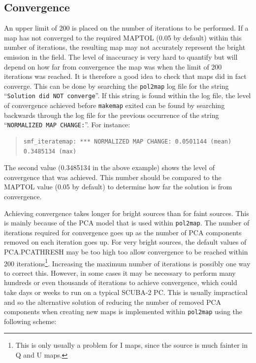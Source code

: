 \documentclass[twoside,11pt]{starlink}
\begin{document}
\subsection{Convergence}
An upper limit of 200 is placed on the number of iterations to be
performed. If a map has not converged to the required MAPTOL (0.05 by
default) within this number of iterations, the resulting map may not
accurately represent the bright emission in the field. The level of
inaccuracy is very hard to quantify but will depend on how far from
convergence the map was when the limit of 200 iterations was reached. It
is therefore a good idea to check that maps did in fact converge. This
can be done by searching the \texttt{pol2map} log file for the string
``\texttt{Solution did NOT converge}''. If this string is found within
the log file, the level of convergence achieved before \texttt{makemap}
exited can be found by searching backwards through the log file for the
previous occurrence of the string ``\texttt{NORMALIZED MAP CHANGE:}''. For
instance:

\begin{quote}
\begin{verbatim}
smf_iteratemap: *** NORMALIZED MAP CHANGE: 0.0501144 (mean) 0.3485134 (max)
\end{verbatim}
\end{quote}

The second value (0.3485134 in the above example) shows the level of
convergence that was achieved. This number should be compared to the
MAPTOL value (0.05 by default) to determine how far the solution is from
convergence.

Achieving convergence takes longer for bright sources than for faint
sources. This is mainly because of the PCA model that is used within
\texttt{pol2map}. The number of iterations required for convergence goes
up as the number of PCA components removed on each iteration goes up. For
very bright sources, the default values of PCA.PCATHRESH may be too high
too allow convergence to be reached within 200 iterations\footnote{This
is only usually a problem for I maps, since the source is much fainter in
Q and U maps.}. Increasing the maximum number of iterations is possibly
one way to correct this. However, in some cases it may be necessary to
perform many hundreds or even thousands of iterations to achieve
convergence, which could take days or weeks to run on a typical SCUBA-2
PC. This is usually impractical and so the alternative solution of
reducing the number of removed PCA components when creating new maps is
implemented within \texttt{pol2map} using the following scheme:
\end{document}
